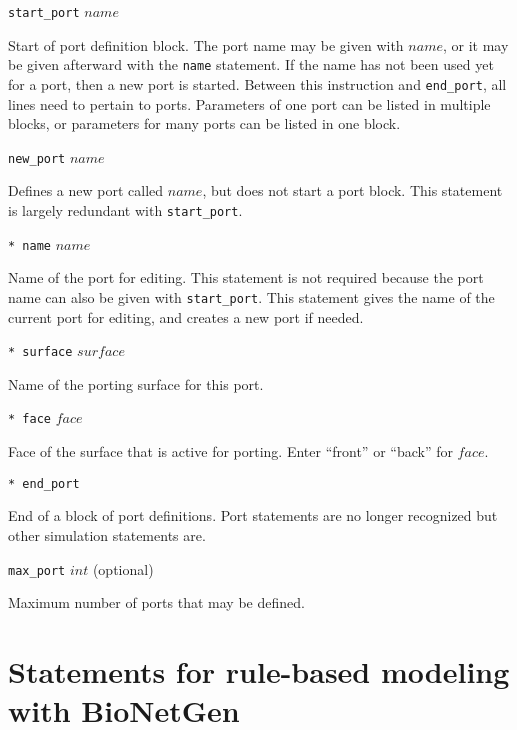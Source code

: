 \documentclass {scrbook}
\newcommand {\ttt} {\texttt}
\begin{document}
\begin{description}

\item{\ttt{start\_port} $name$}

Start of port definition block. The port name may be given with $name$, or it may be given afterward with the \ttt{name} statement. If the name has not been used yet for a port, then a new port is started. Between this instruction and \ttt{end\_port}, all lines need to pertain to ports. Parameters of one port can be listed in multiple blocks, or parameters for many ports can be listed in one block.

\item{\ttt{new\_port} $name$}

Defines a new port called $name$, but does not start a port block. This statement is largely redundant with \ttt{start\_port}.

\item{\ttt{* name} $name$}

Name of the port for editing. This statement is not required because the port name can also be given with \ttt{start\_port}. This statement gives the name of the current port for editing, and creates a new port if needed.

\item{\ttt{* surface} $surface$}

Name of the porting surface for this port.

\item{\ttt{* face} $face$}

Face of the surface that is active for porting. Enter ``front'' or ``back'' for $face$.

\item{\ttt{* end\_port}}

End of a block of port definitions. Port statements are no longer recognized but other simulation statements are.

\item{\ttt{max\_port} $int$} (optional)

Maximum number of ports that may be defined.

\end{description}

\section{Statements for rule-based modeling with BioNetGen}
\end{document}
